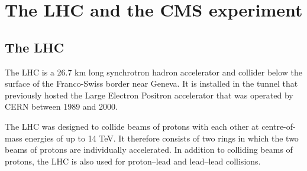 \chapter{The \acs{LHC} and the \acs{CMS} experiment}
\label{chap:CMSLHC}

\section{The \acs{LHC}}
\label{sec:CMSLHC_LHC}

The \acf{LHC} \cite{lhc-machine}  is a 26.7 km long synchrotron hadron accelerator and collider below the surface of the 
Franco-Swiss border near Geneva. It
is installed in the tunnel that previously hosted the Large Electron Positron accelerator
that was operated by \acf{CERN} between 1989 and 2000.

The \ac{LHC} was designed to collide beams of protons with each other at centre-of-mass
energies of up to 14 TeV. It therefore consists of two rings in which the two beams
of protons are individually accelerated. In addition to colliding beams of protons, the \ac{LHC}
is also used for proton--lead and lead--lead collisions.

